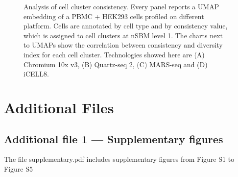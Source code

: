 \documentclass{bmcart}
\def\texttt{[image: ]}
\begin{document}
\begin{backmatter}
\begin{figure}[h!]
\centering
\caption[]{Analysis of cell cluster consistency. Every panel reports a UMAP embedding of a PBMC + HEK293 cells profiled on different platform. Cells are annotated by cell type and by consistency value, which is assigned to cell clusters at nSBM level 1. The charts next to UMAPs show the correlation between consistency and diversity index for each cell cluster. Technologies showed here are (A) Chromium 10x v3, (B) Quartz-seq 2, (C) MARS-seq and (D) iCELL8.}\label{Figure3}
\end{figure}





\section*{Additional Files}
  \subsection*{Additional file 1 --- Supplementary figures}
  The file supplementary.pdf includes supplementary figures from Figure S1 to Figure S5

\end{backmatter}
\end{document}
